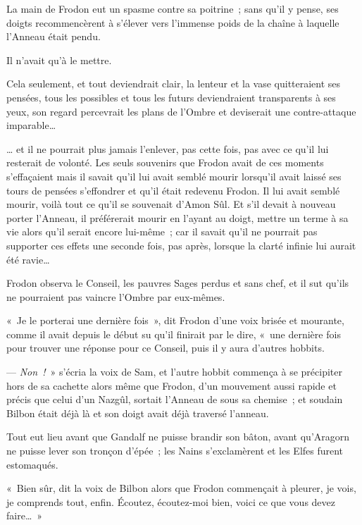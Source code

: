 La main de Frodon eut un spasme contre sa poitrine~; sans qu'il y pense, ses doigts recommencèrent à s'élever vers l'immense poids de la chaîne à laquelle l'Anneau était pendu.

Il n'avait qu'à le mettre.

Cela seulement, et tout deviendrait clair, la lenteur et la vase quitteraient ses pensées, tous les possibles et tous les futurs deviendraient transparents à ses yeux, son regard percevrait les plans de l'Ombre et deviserait une contre-attaque imparable…

… et il ne pourrait plus jamais l'enlever, pas cette fois, pas avec ce qu'il lui resterait de volonté. Les seuls souvenirs que Frodon avait de ces moments s'effaçaient mais il savait qu'il lui avait semblé mourir lorsqu'il avait laissé ses tours de pensées s'effondrer et qu'il était redevenu Frodon. Il lui avait semblé mourir, voilà tout ce qu'il se souvenait d'Amon Sûl. Et s'il devait à nouveau porter l'Anneau, il préférerait mourir en l'ayant au doigt, mettre un terme à sa vie alors qu'il serait encore lui-même~; car il savait qu'il ne pourrait pas supporter ces effets une seconde fois, pas après, lorsque la clarté infinie lui aurait été ravie…

Frodon observa le Conseil, les pauvres Sages perdus et sans chef, et il sut qu'ils ne pourraient pas vaincre l'Ombre par eux-mêmes.

«~Je le porterai une dernière fois~», dit Frodon d'une voix brisée et mourante, comme il avait depuis le début su qu'il finirait par le dire, «~une dernière fois pour trouver une réponse pour ce Conseil, puis il y aura d'autres hobbits.

--- \emph{Non~!}~» s'écria la voix de Sam, et l'autre hobbit commença à se précipiter hors de sa cachette alors même que Frodon, d'un mouvement aussi rapide et précis que celui d'un Nazgûl, sortait l'Anneau de sous sa chemise~; et soudain Bilbon était déjà là et son doigt avait déjà traversé l'anneau.

Tout eut lieu avant que Gandalf ne puisse brandir son bâton, avant qu'Aragorn ne puisse lever son tronçon d'épée~; les Nains s'exclamèrent et les Elfes furent estomaqués.

«~Bien sûr, dit la voix de Bilbon alors que Frodon commençait à pleurer, je vois, je comprends tout, enfin. Écoutez, écoutez-moi bien, voici ce que vous devez faire…~»
\pagebreak[2]


